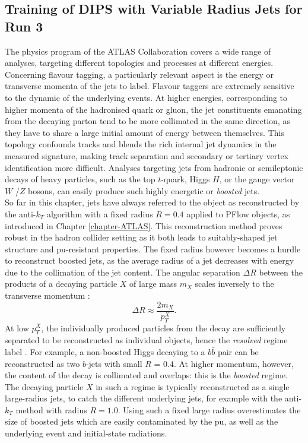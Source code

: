 \subsection{Training of DIPS with Variable Radius Jets for Run 3}\label{chapter:dipsVRtrain}
The physics program of the ATLAS Collaboration covers a wide range of analyses, targeting different topologies and processes at different energies. Concerning flavour tagging, a particularly relevant aspect is the energy or transverse momenta of the jets to label. Flavour taggers are extremely sensitive to the dynamic of the underlying events. At higher energies, corresponding to higher momenta of the hadronised quark or gluon, the jet constituents emanating from the decaying parton tend to be more collimated in the same direction, as they have to share a large initial amount of energy between themselves. This topology confounds tracks and blends the rich internal jet dynamics in the measured signature, making track separation and secondary or tertiary vertex identification more difficult. Analyses targeting jets from hadronic or semileptonic decays of heavy particles, such as the top $t$-quark, Higgs $H$, or the gauge vector $W$ /$Z$ bosons, can easily produce such highly energetic or \textit{boosted} jets.  \\

So far in this chapter, jets have always referred to the object as reconstructed by the anti-$k_T$ algorithm with a fixed radius $R = 0.4$ applied to PFlow objects, as introduced in Chapter \ref{chapter-ATLAS}. This reconstruction method proves robust in the hadron collider setting as it both leads to suitably-shaped jet structure and \gls{pu}-resistant properties. The fixed radius however becomes a hurdle to reconstruct boosted jets, as the average radius of a jet decreases with energy due to the collimation of the jet content. The angular separation $\Delta R$ between the products of a decaying particle $X$ of large mass $m_X$ scales inversely to the transverse momentum \cite{ATLAS:largeRjet}: 
\begin{equation}\label{eq:sizeJet}
  \Delta R \approx \frac{2 m_X}{p_T^X}.
\end{equation}
At low $p_T^X$, the individually produced particles from the decay are sufficiently separated to be reconstructed as individual objects, hence the \textit{resolved} regime label \cite{ATLAS:2016hcf}. For example, a non-boosted Higgs decaying to a $b\bar{b}$ pair can be reconstructed as two $b$-jets with small $R$ = 0.4. At higher momentum, however, the content of the decay is collimated and overlaps: this is the \textit{boosted} regime. The decaying particle $X$ in such a regime is typically reconstructed as a single large-radius jets, to catch the different underlying jets, for example with the anti-$k_T$ method with radius $R = 1.0$. Using such a fixed large radius overestimates the size of boosted jets which are easily contaminated by the \gls{pu}, as well as the underlying event and initial-state radiations.  \\

